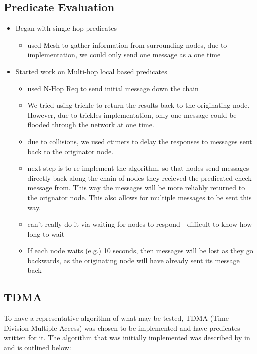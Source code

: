 \subsection{Predicate Evaluation}

\begin{itemize}
	\item[] Began with single hop predicates
	\begin{itemize}
		\item used Mesh to gather information from surrounding nodes, due to implementation, we could only send one message as a one time
	\end{itemize}	
	\item[] Started work on Multi-hop local based predicates
	\begin{itemize}
		\item used N-Hop Req to send initial message down the chain
		\item We tried using trickle to return the results back to the originating node. However, due to trickles implementation, only one message could be flooded through the network at one time. 
		\item due to collisions, we used ctimers to delay the responses to messages sent back to the originator node.
		\item next step is to re-implement the algorithm, so that nodes send messages directly back along the chain of nodes they recieved the predicated check message from. This way the messages will be more reliably returned to the orignator node. This also allows for multiple messages to be sent this way.
		\item can't really do it via waiting for nodes to respond - difficult to know how long to wait
		\item[] If each node waits (e.g.) 10 seconds, then messages will be lost as they go backwards, as the originating node will have already sent its message back
	\end{itemize}	
\end{itemize}


\subsection{TDMA}

To have a representative algorithm of what may be tested, TDMA (Time Division Multiple Access) was chosen to be implemented and have predicates written for it. The algorithm that was initially implemented was described by \citeauthor{DCATechReport} in \cite[p.~4]{DCATechReport} and is outlined below:

